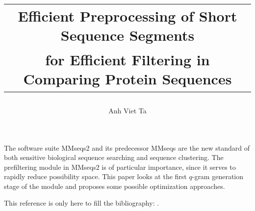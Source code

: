 \documentclass[twoside,a4paper,bsc]{master}
\newcommand{\Qgram}[1]{\(#1\)-gram}
\begin{document}

\author{Anh Viet Ta}
\title{
       \begin{tabular}{c}
       \textbf{Efficient Preprocessing of Short Sequence Segments}\\[3mm]
       \textbf{for Efficient Filtering in Comparing Protein Sequences}
       \end{tabular}}
\Maketitle

\small

The software suite MMseqs2 and its predecessor MMseqs are the new standard
of both sensitive biological sequence searching and sequence clustering.
The prefiltering module in MMseqs2 is of particular importance, since it
serves to rapidly reduce possibility space. This paper looks at the first
\Qgram{q} generation stage of the module and proposes some possible
optimization approaches.

This reference is only here to fill the bibliography: \cite{articleex}.
\normalsize

\setcounter{tocdepth}{1}
\tableofcontents

\end{document}
